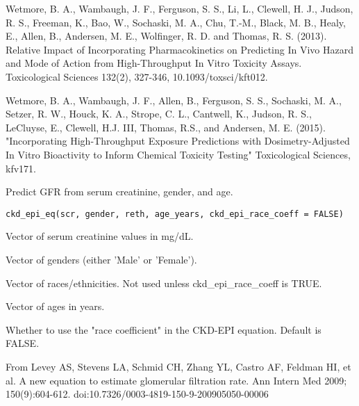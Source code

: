 \documentclass[a4paper]{book}
\begin{document}
\begin{References}
Wetmore, B. A., Wambaugh, J. F., Ferguson, S. S., Li, L., Clewell, H. J.,
Judson, R. S., Freeman, K., Bao, W., Sochaski, M. A., Chu, T.-M., Black, M.
B., Healy, E., Allen, B., Andersen, M. E., Wolfinger, R. D. and Thomas, R.
S. (2013). Relative Impact of Incorporating Pharmacokinetics on Predicting
In Vivo Hazard and Mode of Action from High-Throughput In Vitro Toxicity
Assays. Toxicological Sciences 132(2), 327-346, 10.1093/toxsci/kft012.

Wetmore, B. A., Wambaugh, J. F., Allen, B., Ferguson, S. S., Sochaski, M.
A., Setzer, R. W., Houck, K. A., Strope, C. L., Cantwell, K., Judson, R. S.,
LeCluyse, E., Clewell, H.J. III, Thomas, R.S., and Andersen, M. E. (2015).
"Incorporating High-Throughput Exposure Predictions with Dosimetry-Adjusted
In Vitro Bioactivity to Inform Chemical Toxicity Testing" Toxicological
Sciences, kfv171.
\end{References}
%
\begin{Description}\relax
Predict GFR from serum creatinine, gender, and age.
\end{Description}
%
\begin{Usage}
\begin{verbatim}
ckd_epi_eq(scr, gender, reth, age_years, ckd_epi_race_coeff = FALSE)
\end{verbatim}
\end{Usage}
%
\begin{Arguments}
\begin{ldescription}
\item[\code{scr}] Vector of serum creatinine values in mg/dL.

\item[\code{gender}] Vector of genders (either 'Male' or 'Female').

\item[\code{reth}] Vector of races/ethnicities. Not used unless ckd\_epi\_race\_coeff is TRUE.

\item[\code{age\_years}] Vector of ages in years.

\item[\code{ckd\_epi\_race\_coeff}] Whether to use the "race coefficient" in the CKD-EPI equation. Default is FALSE.
\end{ldescription}
\end{Arguments}
%
\begin{Details}\relax
From Levey AS, Stevens LA, Schmid CH, Zhang YL, Castro AF, Feldman HI, et al. A new
equation to estimate glomerular filtration rate. Ann Intern Med 2009;
150(9):604-612. doi:10.7326/0003-4819-150-9-200905050-00006
\end{Details}
\end{document}
